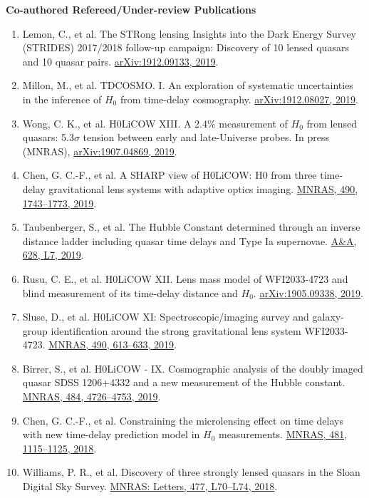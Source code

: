 \documentclass[11pt]{article}
\begin{document}
\textbf{Co-authored Refereed/Under-review Publications} 
\begin{enumerate}
	\item Lemon, C., et al. The STRong lensing Insights into the Dark Energy Survey (STRIDES) 2017/2018 follow-up campaign: Discovery of 10 lensed quasars and 10 quasar pairs. \href{https://arxiv.org/abs/1912.09133}{arXiv:1912.09133, 2019}.
	\item Millon, M., et al. TDCOSMO. I. An exploration of systematic uncertainties in the inference of $H_0$ from time-delay cosmography. \href{https://arxiv.org/abs/1912.08027}{arXiv:1912.08027, 2019}.
	\item Wong, C. K., et al. H0LiCOW XIII. A 2.4\% measurement of $H_0$ from lensed quasars: 5.3$\sigma$ tension between early and late-Universe probes. In press (MNRAS), \href{https://arxiv.org/abs/1907.04869}{arXiv:1907.04869, 2019}.
	\item Chen, G. C.-F., et al. A SHARP view of H0LiCOW: H0 from three time-delay gravitational lens systems with adaptive optics imaging. \href{https://academic.oup.com/mnras/article/doi/10.1093/mnras/stz2547/5568378/}{MNRAS, 490, 1743--1773, 2019}.
	\item Taubenberger, S., et al. The Hubble Constant determined through an inverse distance ladder including quasar time delays and Type Ia supernovae. \href{https://www.aanda.org/articles/aa/abs/2019/08/aa35980-19/aa35980-19.html}{A\&A, 628, L7, 2019}.
	\item Rusu, C. E., et al. H0LiCOW XII. Lens mass model of WFI2033-4723 and blind measurement of its time-delay distance and $H_0$. \href{http://adsabs.harvard.edu/abs/2019arXiv190509338R}{arXiv:1905.09338, 2019}.
	\item Sluse, D., et al. H0LiCOW XI: Spectroscopic/imaging survey and galaxy-group identification around the strong gravitational lens system WFI2033-4723. \href{https://academic.oup.com/mnras/article/doi/10.1093/mnras/stz2483/5561514/}{MNRAS, 490, 613--633, 2019}.
	\item Birrer, S., et al. H0LiCOW - IX. Cosmographic analysis of the doubly imaged quasar SDSS 1206+4332 and a new measurement of the Hubble constant. \href{https://doi.org/10.1093/mnras/stz200}{MNRAS, 484, 4726--4753, 2019}.
	\item Chen, G. C.-F., et al. Constraining the microlensing effect on time delays with new time-delay prediction model in $H_0$ measurements. \href{https://doi.org/10.1093/mnras/sty2350}{MNRAS, 481, 1115--1125, 2018}.
 	\item Williams, P. R., et al. Discovery of three strongly lensed quasars in the Sloan Digital Sky Survey. \href{https://doi.org/10.1093/mnrasl/sly043}{MNRAS: Letters, 477, L70--L74, 2018}.
\end{enumerate}
\end{document}
